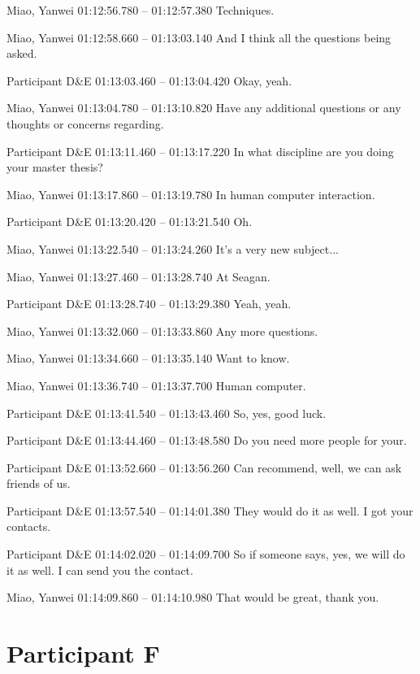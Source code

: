 {Miao, Yanwei 01:12:56.780 -- 01:12:57.380
Techniques.

Miao, Yanwei 01:12:58.660 -- 01:13:03.140
And I think all the questions being asked.

Participant D\&E 01:13:03.460 -- 01:13:04.420
Okay, yeah.

Miao, Yanwei 01:13:04.780 -- 01:13:10.820
Have any additional questions or any thoughts or concerns regarding.

Participant D\&E 01:13:11.460 -- 01:13:17.220
In what discipline are you doing your master thesis?

Miao, Yanwei 01:13:17.860 -- 01:13:19.780
In human computer interaction.

Participant D\&E 01:13:20.420 -- 01:13:21.540
Oh.

Miao, Yanwei 01:13:22.540 -- 01:13:24.260
It's a very new subject...

Miao, Yanwei 01:13:27.460 -- 01:13:28.740
At Seagan.

Participant D\&E 01:13:28.740 -- 01:13:29.380
Yeah, yeah.

Miao, Yanwei 01:13:32.060 -- 01:13:33.860
Any more questions.

Miao, Yanwei 01:13:34.660 -- 01:13:35.140
Want to know.

Miao, Yanwei 01:13:36.740 -- 01:13:37.700
Human computer.

Participant D\&E 01:13:41.540 -- 01:13:43.460
So, yes, good luck.

Participant D\&E 01:13:44.460 -- 01:13:48.580
Do you need more people for your.

Participant D\&E 01:13:52.660 -- 01:13:56.260
Can recommend, well, we can ask friends of us.

Participant D\&E 01:13:57.540 -- 01:14:01.380
They would do it as well. I got your contacts.

Participant D\&E 01:14:02.020 -- 01:14:09.700
So if someone says, yes, we will do it as well. I can send you the contact.

Miao, Yanwei 01:14:09.860 -- 01:14:10.980
That would be great, thank you.
}


\section*{Participant F}

